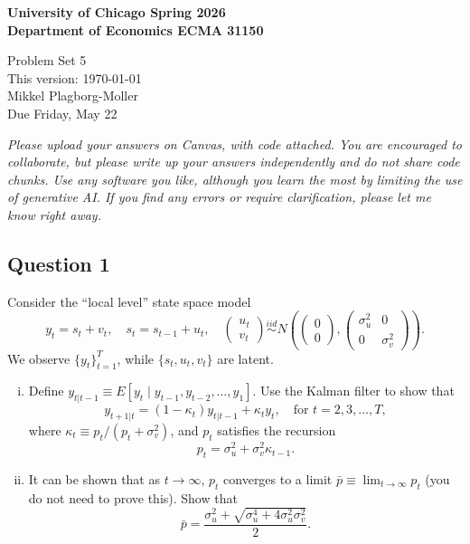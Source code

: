 \documentclass[12pt]{article}
\theoremstyle{plain}
\begin{document}
{\noindent \bf University of Chicago \hfill
Spring 2026 \\
Department of Economics \hfill ECMA 31150}

\begin{center}
{\Large Problem Set 5} \\
This version: \today \\[1ex]
Mikkel Plagborg-Moller \\
\vspace{0.5\baselineskip}
Due Friday, May 22
\end{center}
\vspace{0.2\baselineskip}

\noindent \emph{Please upload your answers on Canvas, with code attached. You are encouraged to collaborate, but please write up your answers independently and do not share code chunks. Use any software you like, although you learn the most by limiting the use of generative AI. If you find any errors or require clarification, please let me know right away.}

\subsection*{Question 1}
Consider the ``local level'' state space model
\[y_t = s_t + v_t,\quad s_t = s_{t-1} + u_t,\quad \begin{pmatrix}
u_t \\
v_t
\end{pmatrix} \overset{iid}{\sim} N\left(\begin{pmatrix}
0 \\
0
\end{pmatrix}, \begin{pmatrix}
\sigma_u^2 & 0 \\
0 & \sigma_v^2
\end{pmatrix} \right).\]
We observe $\lbrace y_t \rbrace_{t=1}^T$, while $\lbrace s_t,u_t,v_t \rbrace$ are latent.

\begin{enumerate}[i)]
\item Define $y_{t|t-1} \equiv E[y_t \mid y_{t-1},y_{t-2},\dots,y_1]$. Use the Kalman filter to show that
\[y_{t+1|t} = (1-\kappa_t) y_{t|t-1} + \kappa_t y_t,\quad \text{for } t=2,3,\dots,T,\]
where $\kappa_t \equiv p_t/(p_t + \sigma_v^2)$, and $p_t$ satisfies the recursion
\[p_t = \sigma_u^2 + \sigma_v^2\kappa_{t-1}.\]
\item It can be shown that as $t \to \infty$, $p_t$ converges to a limit $\bar{p} \equiv \lim_{t \to \infty} p_t$ (you do not need to prove this). Show that
\[\bar{p} = \frac{\sigma_u^2 + \sqrt{\sigma_u^4 + 4\sigma_u^2\sigma_v^2}}{2}.\]

\end{enumerate}
\end{document}
